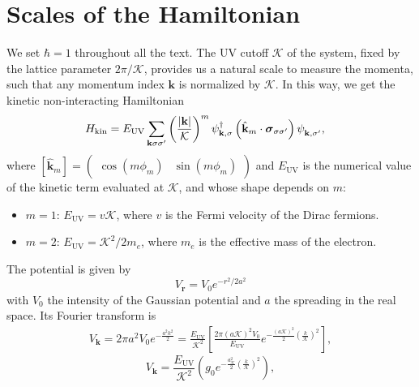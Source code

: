 \documentclass[english,aps,prd,nofootinbib,twocolumn]{revtex4-1}
\begin{document}
\section{Scales of the Hamiltonian}
We set $\hbar = 1$ throughout all the text. The UV cutoff $\mathcal{K}$ of the system, fixed by the lattice parameter $2\pi/\mathcal{K}$, provides us a natural scale to measure the momenta, such that any momentum index $\mathbf{k}$ is normalized by $\mathcal{K}$. In this way, we get the kinetic non-interacting Hamiltonian
\begin{equation}
\label{eq:Main-Ham}
\begin{split}
&H_{\mathrm{kin}} = 
E_{\mathrm{UV} }\sum_{\mathbf{k }\sigma\sigma'}
\left(\frac{|\mathbf{k}|}{\mathcal{K}}\right)^{m}
\psi_{\mathbf{k },\sigma}^{\textcolor{black}{\dagger}}
\left( \hat{\mathbf{k}}_{m} \cdot 
\boldsymbol{\sigma}_{\sigma\sigma'} \right)
\psi_{\mathbf{k },\sigma'}^{\textcolor{white}{\dagger}}
,
\end{split}
\end{equation}
where $[\hat{\mathbf{k}}_{m}]= 
\begin{pmatrix}
\cos(m\phi_{m})	&	\!\!\sin(m\phi_{m})
\end{pmatrix}$ and $E_{\mathrm{UV} }$ is the numerical value of the kinetic term evaluated at $\mathcal{K}$, and whose shape depends on $m$:
\begin{itemize}
\item $m=1$: $E_{\mathrm{UV} } = v\mathcal{K}$, where $v$ is the Fermi velocity of the Dirac fermions.
\item $m=2$: $E_{\mathrm{UV} } = \mathcal{K}^{2}/2m_{e}$, where $m_{e}$ is the effective mass of the electron. 
\end{itemize}
The potential is given by
\begin{equation}
V_{\mathbf{r}} = 
V_{0}e^{-r^{2}/2a^{2}}
\end{equation}
with $V_{0}$ the intensity of the Gaussian potential and $a$ the spreading in the real space. Its Fourier transform is
\begin{eqnarray*}
\nonumber	
V_{\mathbf{k}} = 2\pi a^{2}V_{0}
e^{-\tfrac{a^{2}k^{2}}{2}}\!
= \frac{E_{\mathrm{UV}}}{\mathcal{K}^{2}} 
\left[ \frac{2\pi (a\mathcal{K})^{2}V_{0}}{E_{\mathrm{UV}}}
e^{-\tfrac{(a{\mathcal{K}})^{2}}{2}
\left( \tfrac{k}{\mathcal{K}} \right)^{2}}
\right],	
\end{eqnarray*}
\vspace{-.5cm}
\begin{equation}
\label{eq:Fourier-Potential}
V_{\mathbf{k}} = \frac{E_{\mathrm{UV}}}{\mathcal{K}^{2}} 
\left( g_{0} 
e^{-\tfrac{a_{\mathcal{K}}^{2}}{2}
\left( \tfrac{k}{\mathcal{K}} \right)^{2}}
\right),	
\end{equation}
\end{document}

